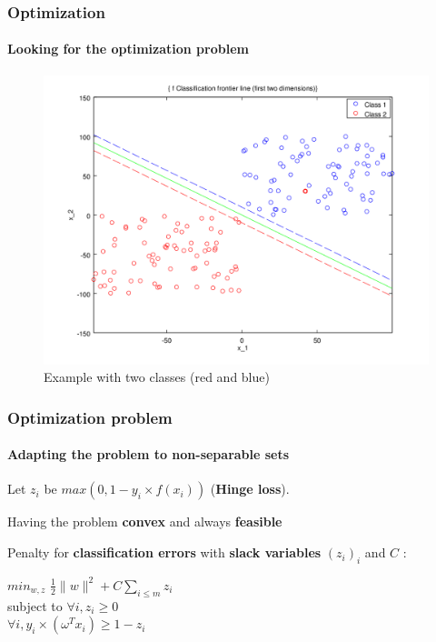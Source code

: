 \documentclass{beamer}
\begin{document}
\begin{frame}
\frametitle{Optimization}
\framesubtitle{Looking for the optimization problem}

         \begin{figure}
         \centering
         \caption{Example with two classes (red and blue)}
         \includegraphics[scale=0.4]{images/voronoi2.png}
         \end{figure}

\end{frame}

\begin{frame}
\frametitle{Optimization problem}
\framesubtitle{Adapting the problem to \textbf{non-separable sets}}

Let $z_i$ be $max(0, 1-y_i \times f(x_i))$ (\textbf{Hinge loss}).

\pause

\bigskip

\begin{block}{Having the problem \textbf{convex} and always \textbf{feasible}}

Penalty for \textbf{classification errors} with \textbf{slack variables} $(z_i)_i$ and $C$ :

           \begin{center}
           $min_{w, z}$ $\frac{1}{2} \|w\|^2 + C \sum_{i \leq m}z_i$\\
           subject to $\forall i, z_i \geq 0$\\
           $\forall i, y_i \times (\omega^{T} x_i) \geq 1 - z_i$\\
           \end{center}

\end{block}

\end{frame}
\end{document}
